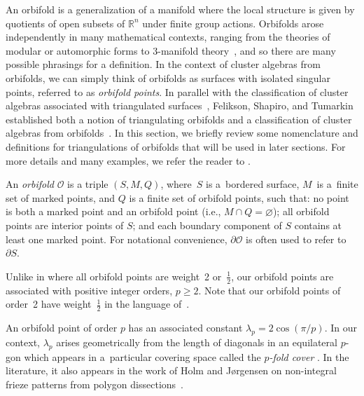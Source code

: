 \documentclass[pdftex]{sigma}%
\numberwithin{equation}{section}
\begin{document}
An orbifold is a generalization of a manifold where the local structure is given by quotients of open subsets of $\mathbb{R}^n$ under finite group actions. Orbifolds arose independently in many mathematical contexts, ranging from the theories of modular or automorphic forms \cite{Satake} to $3$-manifold theory~\cite{Thurston}, and so there are many possible phrasings for a definition. In the context of cluster algebras from orbifolds, we can simply think of orbifolds as surfaces with isolated singular points, referred to as \emph{orbifold points}.
In parallel with the classification of cluster algebras associated with triangulated surfaces~\cite{FST-triangulatedSurfaces, FT-II}, Felikson, Shapiro, and Tumarkin established both a notion of triangulating orbifolds and a classification of cluster algebras from orbifolds~\cite{FST-orbTriang}. In this section, we briefly review some nomenclature and definitions for triangulations of orbifolds that will be used in later sections. For more details and many examples, we refer the reader to \cite[Section~4]{FST-orbTriang}.

\begin{Definition}
An \emph{orbifold} $\mathcal{O}$ is a triple $(S,M,Q)$, where~$S$ is a~bordered surface, $M$~is a~finite set of marked points, and $Q$ is a finite set of orbifold points, such that: no point is both a marked point and an orbifold point (i.e., $M \cap Q = \varnothing$); all orbifold points are interior points of $S$; and each boundary component of $S$ contains at least one marked point. For notational convenience, $\partial \mathcal{O}$ is often used to refer to $\partial S$.
\end{Definition}

\begin{Remark}
Unlike in \cite{Felikson-Shapiro-Tumarkin} where all orbifold points are weight~2 or~$\frac12$, our orbifold points are associated with positive integer orders, $p \geq 2$. Note that our orbifold points of order~2 have weight~$\frac12$ in the language of~\cite{Felikson-Shapiro-Tumarkin}.
\end{Remark}

An orbifold point of order $p$ has an associated constant $\lambda_p = 2\cos(\pi/p)$. In our context, $\lambda_p$ arises geometrically from the length of diagonals in an equilateral $p$-gon which appears in a~particular covering space called the \emph{$p$-fold cover} \cite{Chekhov-Shapiro, L-FV}. In the literature, it also appears in the work of Holm and J{\o}rgensen on non-integral frieze patterns from polygon dissections~\cite{HJ}.
\end{document}
